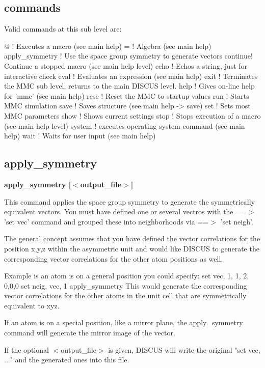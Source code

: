 \subsection*{commands}
Valid commands at this sub level are: 
\par
\begin{MacVerbatim}
@       ! Executes a macro (see main help)
=       ! Algebra (see main help)
apply_symmetry ! Use the space group symmetry to generate vectors
continue! Continue a stopped macro (see main help level)
echo    ! Echos a string, just for interactive check
eval    ! Evaluates an expression (see main help)
exit    ! Terminates the MMC sub level, returns to the main DISCUS level.
help    ! Gives on-line help for 'mmc' (see main help)
rese    ! Reset the MMC to startup values
run     ! Starts MMC simulation
save    ! Saves structure (see main help -> save)
set     ! Sets most MMC parameters
show    ! Shows current settings
stop    ! Stops execution of a macro (see main help level)
system  ! executes operating system command (see main help)
wait    ! Waits for user input (see main help)
\end{MacVerbatim}
\subsection*{apply\_symmetry}
{\bf apply\_symmetry [$ <$output\_file$> $] \par }
\par
\vspace{3pt}
This command applies the space group symmetry to generate the 
symmetrically equivalent vectors. You must have defined one or 
several vectros with the ==$> $ 'set vec' command and grouped 
these into neighborhoods via ==$> $ 'set neigh'. 
\par
The general concept assumes that you have defined the vector 
correlations for the position x,y,z within the asymmetric unit 
and would like DISCUS to generate the corresponding vector 
correlations for the other atom positions as well. 
\par
Example is an atom is on a general position you could specify: 
set vec, 1,  1, 2, 0,0,0 
set neig, vec, 1 
apply\_symmetry 
This would generate the corresponding vector correlations for 
the other atoms in the unit cell that are symmetrically 
equivalent to xyz. 
\par
If an atom is on a special position, like a mirror plane, the 
apply\_symmetry command will generate the mirror image of the 
vector. 
\par
\par
If the optional $ <$output\_file$> $ is given, DISCUS will write the 
original "set vec, ..." and the generated ones into this file. 
